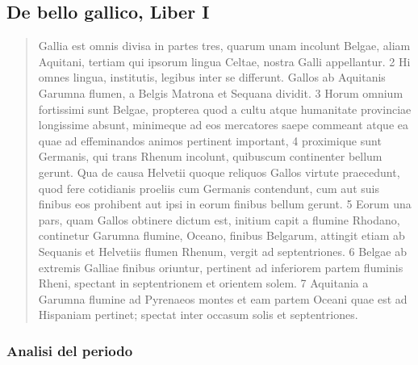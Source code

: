 \documentclass[10pt,a4paper]{article}
\begin{document}
	\subsection{De bello gallico, Liber I}

	\begin{quote}
		Gallia est omnis divisa in partes tres, quarum unam incolunt Belgae, aliam Aquitani, tertiam qui ipsorum lingua Celtae, nostra Galli appellantur. 2 Hi omnes lingua, institutis, legibus inter se differunt. Gallos ab Aquitanis Garumna flumen, a Belgis Matrona et Sequana dividit. 3 Horum omnium fortissimi sunt Belgae, propterea quod a cultu atque humanitate provinciae longissime absunt, minimeque ad eos mercatores saepe commeant atque ea quae ad effeminandos animos pertinent important, 4 proximique sunt Germanis, qui trans Rhenum incolunt, quibuscum continenter bellum gerunt. Qua de causa Helvetii quoque reliquos Gallos virtute praecedunt, quod fere cotidianis proeliis cum Germanis contendunt, cum aut suis finibus eos prohibent aut ipsi in eorum finibus bellum gerunt. 5 Eorum una pars, quam Gallos obtinere dictum est, initium capit a flumine Rhodano, continetur Garumna flumine, Oceano, finibus Belgarum, attingit etiam ab Sequanis et Helvetiis flumen Rhenum, vergit ad septentriones. 6 Belgae ab extremis Galliae finibus oriuntur, pertinent ad inferiorem partem fluminis Rheni, spectant in septentrionem et orientem solem. 7 Aquitania a Garumna flumine ad Pyrenaeos montes et eam partem Oceani quae est ad Hispaniam pertinet; spectat inter occasum solis et septentriones.
	\end{quote}

	\subsubsection{Analisi del periodo}
\end{document}
